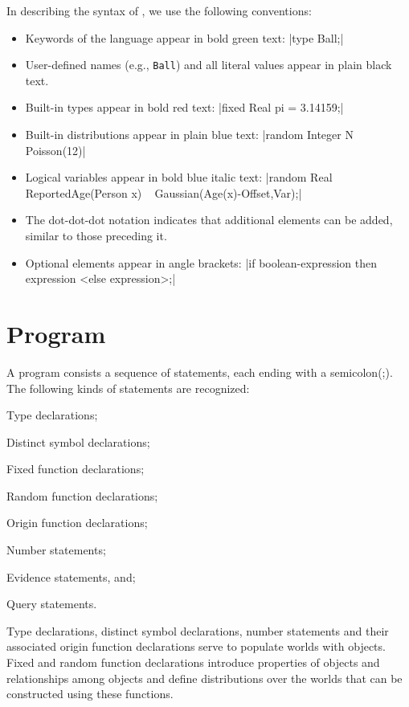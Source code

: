 \documentclass[12pt]{article}
\begin{document}
In describing the syntax of \bl, we use the following conventions:
\begin{itemize}
\item Keywords of the language appear in bold green text: \blog|type Ball;|
\item User-defined names (e.g., {\tt Ball}) and all literal values appear in plain black text.
\item Built-in types appear in bold red text: \blog|fixed Real pi = 3.14159;|
\item Built-in distributions appear in plain blue text: \blog|random Integer N ~ Poisson(12)|
\item Logical variables appear in bold blue italic text: \blog|random Real ReportedAge(Person x) ~ Gaussian(Age(x)-Offset,Var);|
\item The dot-dot-dot notation indicates that additional elements can be added, similar to those preceding it.
\item Optional elements appear in angle brackets: \blog|if boolean-expression then expression <else expression>;|
\end{itemize}

\section{\bl Program}\label{program-section}\label{program-section}
A \bl program consists a sequence of statements, each ending with a semicolon(;). 
The following kinds of statements are recognized:
\begin{enumerate*}
\item Type declarations; 
\item Distinct symbol declarations;
\item Fixed function declarations;
\item Random function declarations;
\item Origin function declarations;
\item Number statements;
\item Evidence statements, and;
\item Query statements.
\end{enumerate*}

Type declarations, distinct symbol declarations, number statements and their associated origin function declarations serve to populate
worlds with objects. Fixed and random function declarations introduce properties of objects and relationships among objects
and define distributions over the worlds that can be constructed using these functions.
\end{document}
